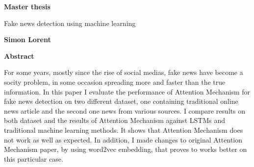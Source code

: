 \thispagestyle{plain}
\begin{center}
    \Large
    \textbf{Master thesis}
 
    \vspace{0.4cm}
    \large
    Fake news detection using machine learning
 
    \vspace{0.4cm}
    \textbf{Simon Lorent}
 
    \vspace{0.9cm}
    \textbf{Abstract}

\end{center}
For some years, mostly since the rise of social medias, fake news have become a socity problem, in some occasion spreading more and faster than the true information.
In this paper I evaluate the performance of Attention Mechanism for fake news detection on two different dataset, one containing traditional online news article and the second one news from various sources. I compare results on both dataset and the results of Attention Mechanism against LSTMs and traditional machine learning methods. It shows that Attention Mechanism does not work as well as expected. In addition, I made changes to original Attention Mechanism paper\cite{zhou-etal-2016-attention}, by using word2vec embedding, that proves to works better on this particular case. 
